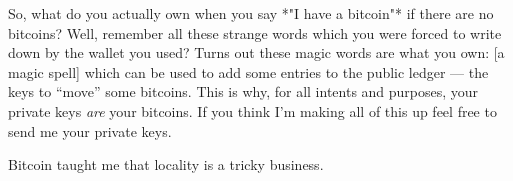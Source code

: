 So, what do you actually own when you say *"I have a bitcoin"* if there
are no bitcoins? Well, remember all these strange words which you were
forced to write down by the wallet you used? Turns out these magic words
are what you own: [a magic spell] which can be used to add some entries
to the public ledger --- the keys to ``move'' some bitcoins. This is why,
for all intents and purposes, your private keys \textit{are} your bitcoins. If
you think I'm making all of this up feel free to send me your private
keys.

Bitcoin taught me that locality is a tricky business.

%
%
%
%
%
%
%
